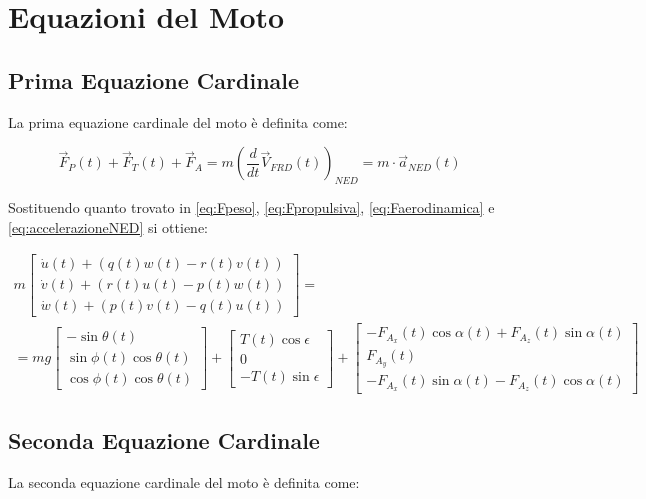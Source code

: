 \section{Equazioni del Moto}

\subsection{Prima Equazione Cardinale}
La prima equazione cardinale del moto è definita come:

\begin{equation*}
    \vec{F}_P(t) + \vec{F}_T(t) + \vec{F}_A = m\left(\frac{d}{dt}\vec{V}_{FRD}(t)\right)_{NED} = m\cdot\vec{a}_{NED}(t)
\end{equation*}

Sostituendo quanto trovato in \eqref{eq:Fpeso}, \eqref{eq:Fpropulsiva}, \eqref{eq:Faerodinamica} e \eqref{eq:accelerazioneNED} si ottiene:

\begin{multline}
    \label{eq:primaEquazioneCardinale}
    m\begin{bmatrix}
        \dot{u}(t) + \left(q(t)w(t) - r(t)v(t)\right) \\
        \dot{v}(t) + \left(r(t)u(t) - p(t)w(t)\right) \\
        \dot{w}(t) + \left(p(t)v(t) - q(t)u(t)\right)
    \end{bmatrix} = \\
    = mg\begin{bmatrix}
        -\sin\theta(t)           \\
        \sin\phi(t)\cos\theta(t) \\
        \cos\phi(t)\cos\theta(t)
    \end{bmatrix} + \begin{bmatrix}
        T(t) \cos\epsilon \\
        0                 \\
        -T(t) \sin\epsilon
    \end{bmatrix} + \begin{bmatrix}
        -F_{A_x}(t) \cos\alpha(t) + F_{A_z}(t) \sin\alpha(t) \\
        F_{A_y}(t)                                           \\
        -F_{A_x}(t)\sin\alpha(t) - F_{A_z}(t)\cos\alpha(t)
    \end{bmatrix}
\end{multline}

\subsection{Seconda Equazione Cardinale}
La seconda equazione cardinale del moto è definita come:


